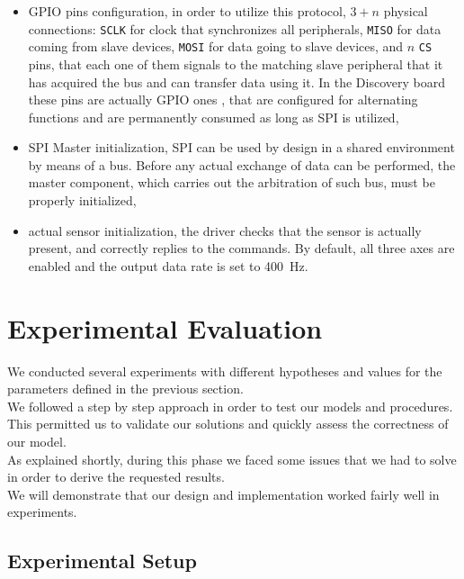 \begin{itemize}
	\item GPIO pins configuration, in order to utilize this protocol, $3 + n$ physical connections: \texttt{SCLK} for clock that synchronizes all peripherals, \texttt{MISO} for data coming from slave devices, \texttt{MOSI} for data going to slave devices, and $n$ \texttt{CS} pins, that each one of them signals to the matching slave peripheral that it has acquired the bus and can transfer data using it. In the Discovery board these pins are actually GPIO ones \cite{STM32F4RefMan}, that are configured for alternating functions and are permanently consumed as long as SPI is utilized,
	\item SPI Master initialization, SPI can be used by design in a shared environment by means of a bus. Before any actual exchange of data can be performed, the master component, which carries out the arbitration of such bus, must be properly initialized,
	\item actual sensor initialization, the driver checks that the sensor is actually present, and correctly replies to the commands. By default, all three axes are enabled and the output data rate is set to \SI{400}{\Hz}.
\end{itemize}
\pagebreak

\section{Experimental Evaluation}
We conducted several experiments with different hypotheses and values for the parameters defined in the previous section. \\
We followed a step by step approach in order to test our models and procedures. This permitted us to validate our solutions and quickly assess the correctness of our model. \\
As explained shortly, during this phase we faced some issues that we had to solve in order to derive the requested results. \\
We will demonstrate that our design and implementation worked fairly well in experiments.
\subsection{Experimental Setup}
